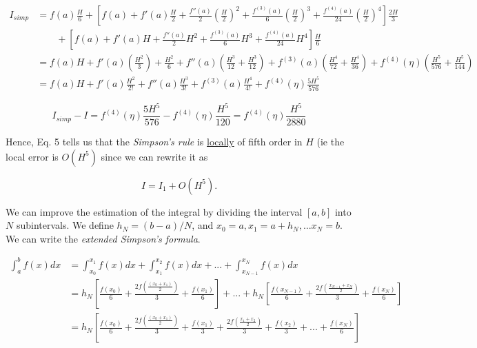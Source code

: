 \documentclass{article}
\begin{document}
\begin{enumerate}
	\begin{align}
		I_{simp} & = f(a)\frac{H}{6} + \left[ f(a) + f'(a) \frac{H}{2} + \frac{f''(a)}{2} \left(\frac{H}{2} \right) ^2 + \frac{f^{(3)}(a)}{6} \left( \frac{H}{2} \right)^3 + \frac{f^{(4)}(a)}{24} \left( \frac{H}{2} \right)^4 \right] \frac{2H}{3} \nonumber \\
		& \qquad + \left[ f(a) + f'(a) H + \frac{f''(a)}{2} H^2 + \frac{f^{(3)}(a)}{6} H^3 + \frac{f^{(4)}(a)}{24}H^4 \right] \frac{H}{6} \nonumber \\		
		&= f(a) H + f'(a) \left(\frac{H^2}{3} \right) + \frac{H^2}{6} + f''(a) \left( \frac{H^3}{12} + \frac{H^3}{12} \right) + f^{(3)}(a) \left( \frac{H^4}{72} + \frac{H^4}{36} \right) + f^{(4)}(\eta) \left( \frac{H^5}{576} + \frac{H^5}{144} \right) \nonumber \\
		&= f(a) H + f'(a) \frac{H^2}{2!} + f''(a) \frac{H^3}{3!} + f^{(3)} (a) \frac{H^4}{4!} + f^{(4)} (\eta) \frac{5H^5}{576}
	\end{align}
	
	\begin{equation}
		I_{simp} - I = f^{(4)} (\eta) \frac{5H^5}{576} - f^{(4)} (\eta) \frac{H^5}{120} = f^{(4)}(\eta) \frac{H^5}{2880}
	\end{equation}

	Hence, Eq. 5 tells us that the \textit{Simpson's rule} is \underline{locally} of fifth order in $H$ (ie the local error is $O(H^5)$ since we can rewrite it as
	
	\begin{equation}
		I = I_1 + O(H^5).
	\end{equation}
	
	We can improve the estimation of the integral by dividing the interval $[a, b]$ into $N$ subintervals. We define $h_N = (b-a)/N$, and $x_0 = a, x_1 = a + h_N,...x_N = b$. We can write the \textit{extended Simpson's formula}.
	
	\begin{align}
		\int_a^b f(x)dx &= \int_{x_0}^{x_1} f(x)dx + \int_{x_1}^{x_2} f(x)dx + ...+\int_{x_{N-1}}^{x_N} f(x)dx	\nonumber \\
		&= h_N \left[ \frac{f(x_0)}{6} + \frac{2f(\frac{(x_0+x_1)}{2})}{3} + \frac{f(x_1)}{6} \right] +...+ h_N \left[ \frac{f(x_{N-1})}{6} + \frac{2f(\frac{x_{N-1}+x_N}{2})}{3} + \frac{f(x_N)}{6}\right] \nonumber \\
		&= h_N \left[\frac{f(x_0)}{6} + \frac{2f(\frac{(x_0+x_1)}{2})}{3} + \frac{f(x_1)}{3} + \frac{2f(\frac{x_1+x_2}{2})}{3} +\frac{f(x_2)}{3} + ...+\frac{f(x_N)}{6} \right]
	\end{align}


\end{enumerate}
\end{document}
